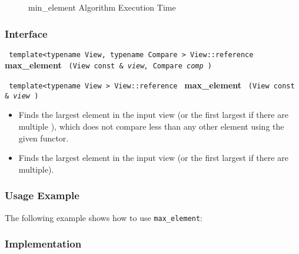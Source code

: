 \begin{figure}[p]
\caption{min\_element Algorithm Execution Time}
\label{fig:minelem-alg-exec-exper}
\end{figure}

 
\subsubsection{Interface} %

\noindent
\texttt{%
template<typename View, typename Compare >
\newline
View::reference 
}
\newline
\textbf{max\_element}%
\texttt{%
(View const \&
\textit{view,}%
Compare 
\textit{comp}%
)
}
\vspace{0.4cm}

\noindent
\texttt{%
template<typename View >
\newline
View::reference 
}
\newline
\textbf{max\_element}%
\texttt{%
(View const \&
\textit{view}%
)
}

\begin{itemize}
\item
Finds the largest element in the input view (or the first largest if there are multiple
), which does not compare less than any other element using the given functor. 
\item
Finds the largest element in the input view (or the first largest if there are multiple). 
\end{itemize}

\subsubsection{Usage Example} %

The following example shows how to use \texttt{max\_element}:

 
\subsubsection{Implementation} %

